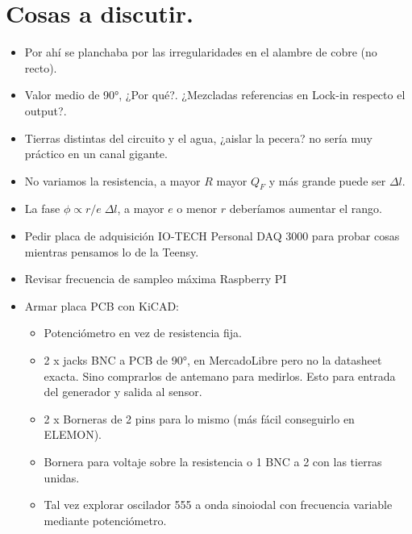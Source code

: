 
\section*{Cosas a discutir.}

\begin{itemize}
	\item Por ahí se planchaba por las irregularidades en el alambre de cobre (no recto).
	\item Valor medio de 90°, ¿Por qué?. ¿Mezcladas referencias en Lock-in respecto el output?. 
	\item Tierras distintas del circuito y el agua, ¿aislar la pecera? no sería muy práctico en un canal gigante. 
	\item No variamos la resistencia, a mayor $R$ mayor $Q_F$ y más grande puede ser $\Delta l$. 
	\item La fase $\phi \propto r/e\;\Delta l$, a mayor $e$ o menor $r$ deberíamos aumentar el rango.
	\item Pedir placa de adquisición IO-TECH Personal DAQ 3000 para probar cosas mientras pensamos lo de la Teensy.
	\item Revisar frecuencia de sampleo máxima Raspberry PI
	\item Armar placa PCB con KiCAD:
	
	\begin{itemize}
		\item Potenciómetro en vez de resistencia fija.
		\item 2 x jacks BNC a PCB de 90°, en MercadoLibre pero no la datasheet exacta. Sino comprarlos de antemano para medirlos. Esto para entrada del generador y salida al sensor.
		\item 2 x Borneras de 2 pins para lo mismo (más fácil conseguirlo en ELEMON).
		\item Bornera para voltaje sobre la resistencia o 1 BNC a 2 con las tierras unidas.
		\item Tal vez explorar oscilador 555 a onda sinoiodal con frecuencia variable mediante potenciómetro. 
	\end{itemize}
\end{itemize}

